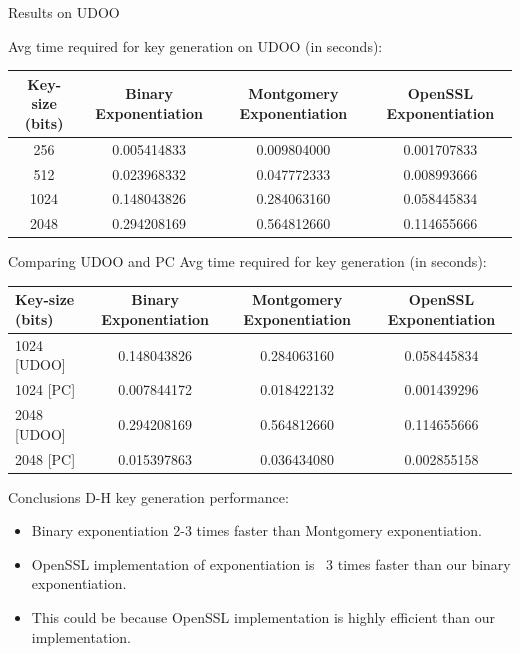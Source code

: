 \documentclass[xcolor=dvipsnames]{beamer}
\begin{document}
\begin{frame}{Results on UDOO}

Avg time required for key generation on UDOO (in seconds):\\
\medskip
{} {
\begin{tabular}{|c | c | c | c |}
\hline
Key-size (bits) & Binary Exponentiation & Montgomery Exponentiation & OpenSSL Exponentiation\\
\hline
256 & 0.005414833 & 0.009804000 & 0.001707833 \\
\hline
512 & 0.023968332 & 0.047772333 & 0.008993666\\
\hline
1024 & 0.148043826 & 0.284063160 & 0.058445834\\
\hline
2048 & 0.294208169 & 0.564812660 & 0.114655666\\
\hline
\end{tabular}
}
\end{frame}


\begin{frame}{Comparing UDOO and PC}
Avg time required for key generation (in seconds):\\
\medskip
{} {
\begin{tabular}{| l | c | c | c |}
\hline
Key-size (bits) & Binary Exponentiation & Montgomery Exponentiation & OpenSSL Exponentiation\\
\hline
1024 [UDOO] & 0.148043826 & 0.284063160 & 0.058445834\\
\hline
1024 [PC] & 0.007844172 & 0.018422132 & 0.001439296\\
\hline
2048 [UDOO] & 0.294208169 & 0.564812660 & 0.114655666\\
\hline
2048 [PC] & 0.015397863 & 0.036434080 & 0.002855158\\
\hline
\end{tabular}
}
\end{frame}

\begin{frame}{Conclusions}
\noindent D-H key generation performance:
\begin{itemize}
\item Binary exponentiation 2-3 times faster than Montgomery exponentiation.
\item OpenSSL implementation of exponentiation is ~3 times faster than our binary exponentiation.
\item This could be because OpenSSL implementation is highly efficient than our implementation.
\end{itemize}
\end{frame}
\end{document}
